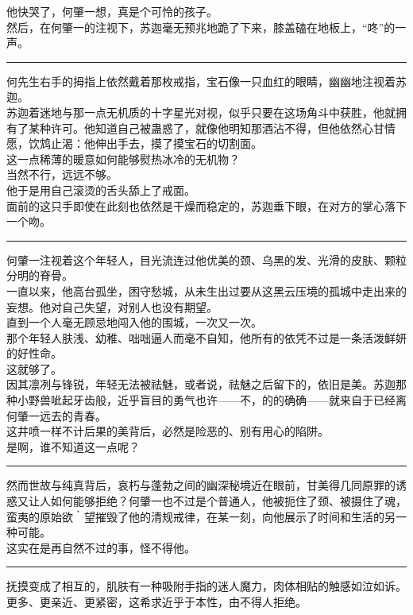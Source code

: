 \documentclass[oneside,11pt]{memoir} %
\begin{document}
\begin{CJK}{UTF8}{gbsn}
    他快哭了，何肇一想，真是个可怜的孩子。\\\indent
    然后，在何肇一的注视下，苏迦毫无预兆地跪了下来，膝盖磕在地板上，“咚”的一声。\\\indent
\rule{-3pt}{30pt}
    何先生右手的拇指上依然戴着那枚戒指，宝石像一只血红的眼睛，幽幽地注视着苏迦。\\\indent
    苏迦着迷地与那一点无机质的十字星光对视，似乎只要在这场角斗中获胜，他就拥有了某种许可。他知道自己被蛊惑了，就像他明知那酒沾不得，但他依然心甘情愿，饮鸩止渴：他伸出手去，摸了摸宝石的切割面。\\\indent
     这一点稀薄的暖意如何能够熨热冰冷的无机物？\\\indent
     当然不行，远远不够。\\\indent
     他于是用自己滚烫的舌头舔上了戒面。\\\indent
     面前的这只手即使在此刻也依然是干燥而稳定的，苏迦垂下眼，在对方的掌心落下一个吻。\\\indent
\rule{-3pt}{30pt}
    何肇一注视着这个年轻人，目光流连过他优美的颈、乌黑的发、光滑的皮肤、颗粒分明的脊骨。\\\indent
    一直以来，他高台孤坐，困守愁城，从未生出过要从这黑云压境的孤城中走出来的妄想。他对自己失望，对别人也没有期望。\\\indent
    直到一个人毫无顾忌地闯入他的围城，一次又一次。\\\indent
    那个年轻人肤浅、幼稚、咄咄逼人而毫不自知，他所有的依凭不过是一条活泼鲜妍的好性命。\\\indent
    这就够了。\\\indent
    因其凛冽与锋锐，年轻无法被祛魅，或者说，祛魅之后留下的，依旧是美。苏迦那种小野兽呲起牙齿般，近乎盲目的勇气也许——不，的的确确——就来自于已经离何肇一远去的青春。\\\indent
    这井喷一样不计后果的美背后，必然是险恶的、别有用心的陷阱。\\\indent
    是啊，谁不知道这一点呢？\\\indent
\rule{-3pt}{30pt}
    然而世故与纯真背后，哀朽与蓬勃之间的幽深秘境近在眼前，甘美得几同原罪的诱惑又让人如何能够拒绝？何肇一也不过是个普通人，他被扼住了颈、被摄住了魂，蛮夷的原始欲｀望摧毁了他的清规戒律，在某一刻，向他展示了时间和生活的另一种可能。\\\indent
     这实在是再自然不过的事，怪不得他。\\\indent
  \rule{-3pt}{30pt}
     抚摸变成了相互的，肌肤有一种吸附手指的迷人魔力，肉体相贴的触感如泣如诉。更多、更亲近、更紧密，这希求近乎于本性，由不得人拒绝。\\\indent

\end{CJK}
\end{document}
